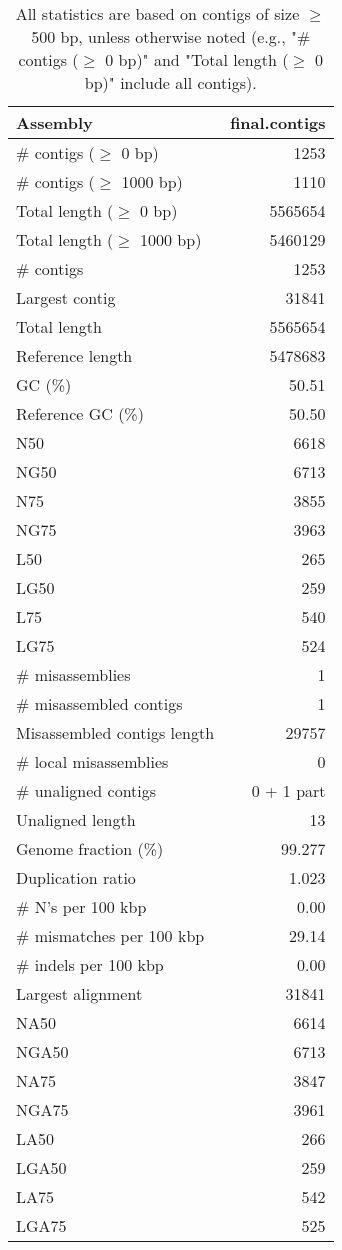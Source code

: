 \documentclass[12pt,a4paper]{article}
\begin{document}
\begin{table}[ht]
\begin{center}
\caption{All statistics are based on contigs of size $\geq$ 500 bp, unless otherwise noted (e.g., "\# contigs ($\geq$ 0 bp)" and "Total length ($\geq$ 0 bp)" include all contigs).}
\begin{tabular}{|l*{1}{|r}|}
\hline
Assembly & final.contigs \\ \hline
\# contigs ($\geq$ 0 bp) & 1253 \\ \hline
\# contigs ($\geq$ 1000 bp) & 1110 \\ \hline
Total length ($\geq$ 0 bp) & 5565654 \\ \hline
Total length ($\geq$ 1000 bp) & 5460129 \\ \hline
\# contigs & 1253 \\ \hline
Largest contig & 31841 \\ \hline
Total length & 5565654 \\ \hline
Reference length & 5478683 \\ \hline
GC (\%) & 50.51 \\ \hline
Reference GC (\%) & 50.50 \\ \hline
N50 & 6618 \\ \hline
NG50 & 6713 \\ \hline
N75 & 3855 \\ \hline
NG75 & 3963 \\ \hline
L50 & 265 \\ \hline
LG50 & 259 \\ \hline
L75 & 540 \\ \hline
LG75 & 524 \\ \hline
\# misassemblies & 1 \\ \hline
\# misassembled contigs & 1 \\ \hline
Misassembled contigs length & 29757 \\ \hline
\# local misassemblies & 0 \\ \hline
\# unaligned contigs & 0 + 1 part \\ \hline
Unaligned length & 13 \\ \hline
Genome fraction (\%) & 99.277 \\ \hline
Duplication ratio & 1.023 \\ \hline
\# N's per 100 kbp & 0.00 \\ \hline
\# mismatches per 100 kbp & 29.14 \\ \hline
\# indels per 100 kbp & 0.00 \\ \hline
Largest alignment & 31841 \\ \hline
NA50 & 6614 \\ \hline
NGA50 & 6713 \\ \hline
NA75 & 3847 \\ \hline
NGA75 & 3961 \\ \hline
LA50 & 266 \\ \hline
LGA50 & 259 \\ \hline
LA75 & 542 \\ \hline
LGA75 & 525 \\ \hline
\end{tabular}
\end{center}
\end{table}
\end{document}
